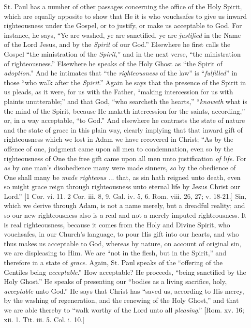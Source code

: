 St. Paul has a number of other passages concerning the office of
the Holy Spirit, which are equally apposite to show that He it is who
vouchsafes to give us inward righteousness under the Gospel, or to
justify, or make us acceptable to God. For instance, he says, ``Ye
are washed, ye are sanctified, ye are \emph{justified} in the Name of
the Lord Jesus, and by the \emph{Spirit} of our God.'' Elsewhere
he first calls the Gospel ``the ministration of the \emph{Spirit},''
and in the next verse, ``the ministration of righteousness.''
Elsewhere he speaks of the Holy Ghost as ``the Spirit of \emph{adoption}.''
And he intimates that ``the \emph{righteousness} of the law''
is ``\emph{fulfilled}'' in those ``who walk after the \emph{Spirit}.''
Again he says that the presence of the Spirit in us pleads, as it
were, for us with the Father, ``making intercession for us with
plaints unutterable;'' and that God, ``who searcheth the
hearts,'' ``\emph{knoweth} what is the mind of the Spirit,
because He maketh intercession for the saints, according,'' or, in
a way acceptable, ``to God.'' And elsewhere he contrasts the
state of nature and the state of grace in this plain way, clearly
implying that that inward gift of righteousness which we lost in Adam
we have recovered in Christ; ``As by the offence of one, judgment
came upon all men to condemnation, even so by the righteousness of One
the free gift came upon all men unto justification \emph{of life}. For
\emph{as} by one man's disobedience many were made sinners, \emph{so} by the
obedience of One shall many be \emph{made righteous} ... that, as sin
hath reigned unto death, even so might grace reign through
righteousness unto eternal life by Jesus Christ our Lord.'' [1 Cor.
vi. 11. 2 Cor. iii. 8, 9. Gal. iv. 5, 6. Rom. viii. 26, 27; v. 18-21.]
Sin, which we derive through Adam, is not a name merely, but a
dreadful reality; and so our new righteousness also is a real and not
a merely imputed righteousness. It is real righteousness, because it
comes from the Holy and Divine Spirit, who vouchsafes, in our Church's
language, to pour His gift into our hearts, and who thus makes us
acceptable to God, whereas by nature, on account of original sin, we
are displeasing to Him. We are ``not in the flesh, but in the
Spirit,'' and therefore in a state of \emph{grace}. Again, St.
Paul speaks of the ``offering of the Gentiles being \emph{acceptable}.''
How acceptable? He proceeds, ``being sanctified by the Holy
Ghost.'' He speaks of presenting our ``bodies as a living
sacrifice, holy, \emph{acceptable} unto God.'' He says that Christ
has ``saved us, according to His mercy, by the washing of
regeneration, and the renewing of the Holy Ghost,'' and that we
are able thereby to ``walk worthy of the Lord unto all \emph{pleasing}.''
[Rom. xv. 16; xii. 1. Tit. iii. 5. Col. i. 10.]

